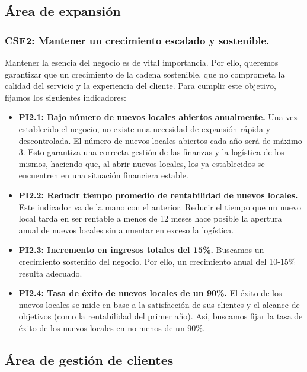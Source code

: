 \documentclass[12pt]{opticajnl}
\begin{document}
\subsection{Área de expansión}

\subsubsection*{CSF2: Mantener un crecimiento escalado y sostenible.}

Mantener la esencia del negocio es de vital importancia. Por ello, queremos garantizar que un crecimiento de la cadena sostenible, que no comprometa la calidad del servicio y la experiencia del cliente. Para cumplir este objetivo, fijamos los siguientes indicadores:

\begin{itemize}
    \item \textbf{PI2.1: Bajo número de nuevos locales abiertos anualmente.} Una vez establecido el negocio, no existe una necesidad de expansión rápida y descontrolada. El número de nuevos locales abiertos cada año será de máximo 3. Esto garantiza una correcta gestión de las finanzas y la logística de los mismos, haciendo que, al abrir nuevos locales, los ya establecidos se encuentren en una situación financiera estable.
    \item \textbf{PI2.2: Reducir tiempo promedio de rentabilidad de nuevos locales.} Este indicador va de la mano con el anterior. Reducir el tiempo que un nuevo local tarda en ser rentable a menos de 12 meses hace posible la apertura anual de nuevos locales sin aumentar en exceso la logística.
    \item \textbf{PI2.3: Incremento en ingresos totales del 15\%.} Buscamos un crecimiento sostenido del negocio. Por ello, un crecimiento anual del 10-15\% resulta adecuado.
    \item \textbf{PI2.4: Tasa de éxito de nuevos locales de un 90\%.} El éxito de los nuevos locales se mide en base a la satisfacción de sus clientes y el alcance de objetivos (como la rentabilidad del primer año). Así, buscamos fijar la tasa de éxito de los nuevos locales en no menos de un 90\%.  
\end{itemize}






\subsection{Área de gestión de clientes}
\end{document}
